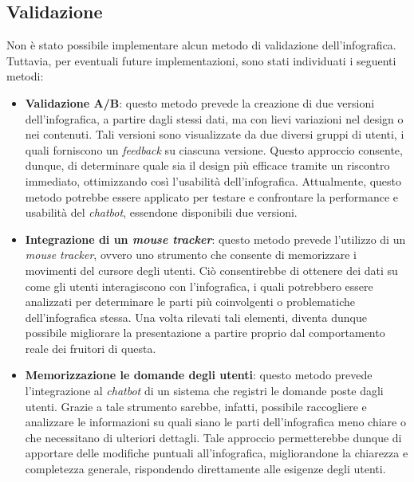 \subsection{Validazione}
Non è stato possibile implementare alcun metodo di validazione dell'infografica. Tuttavia, per eventuali future implementazioni, sono stati individuati i seguenti metodi:
\begin{itemize}
    \item \textbf{Validazione A/B}: questo metodo prevede la creazione di due versioni dell'infografica, a partire dagli stessi dati, ma con lievi variazioni nel design o nei contenuti.
    Tali versioni sono visualizzate da due diversi gruppi di utenti, i quali forniscono un \emph{feedback} su ciascuna versione. 
    Questo approccio consente, dunque, di determinare quale sia il design più efficace tramite un riscontro immediato, ottimizzando così l'usabilità dell'infografica. 
    Attualmente, questo metodo potrebbe essere applicato per testare e confrontare la performance e usabilità del \emph{chatbot}, essendone disponibili due versioni.
    \item \textbf{Integrazione di un \emph{mouse tracker}}: questo metodo prevede l'utilizzo di un \emph{mouse tracker}, ovvero uno strumento che consente di memorizzare i movimenti del cursore degli utenti. 
    Ciò consentirebbe di ottenere dei dati su come gli utenti interagiscono con l'infografica, i quali potrebbero essere analizzati per determinare le parti più coinvolgenti o problematiche dell'infografica stessa. 
    Una volta rilevati tali elementi, diventa dunque possibile migliorare la presentazione a partire proprio dal comportamento reale dei fruitori di questa.
    \item \textbf{Memorizzazione le domande degli utenti}: questo metodo prevede l'integrazione al \emph{chatbot} di un sistema che registri le domande poste dagli utenti.
    Grazie a tale strumento sarebbe, infatti, possibile raccogliere e analizzare le informazioni su quali siano le parti dell'infografica meno chiare o che necessitano di ulteriori dettagli. 
    Tale approccio permetterebbe dunque di apportare delle modifiche puntuali all'infografica, migliorandone la chiarezza e completezza generale, rispondendo direttamente alle esigenze degli utenti.
\end{itemize}
